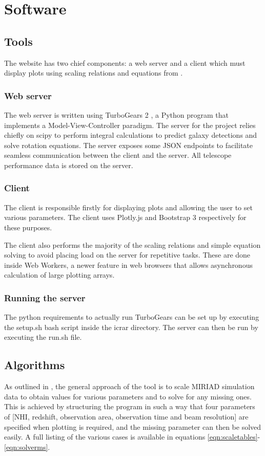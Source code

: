 \documentclass[11pt]{article}
\begin{document}
\section{Software}

\subsection{Tools}

The website has two chief components: a web server and a client which must display plots using scaling relations and equations from \parencite{duffy}.

\subsubsection{Web server}
The web server is written using TurboGears 2 \parencite{turbogears}, a Python program that implements a Model-View-Controller paradigm. The server for the project relies chiefly on scipy \parencite{scipy} to perform integral calculations to predict galaxy detections and solve rotation equations. The server exposes some JSON endpoints to facilitate seamless communication between the client and the server. All telescope performance data is stored on the server.

\subsubsection{Client}
The client is responsible firstly for displaying plots and allowing the user to set various parameters. The client uses Plotly.js \parencite{plotly} and Bootstrap 3 \parencite{bootstrap} respectively for these purposes.

The client also performs the majority of the scaling relations and simple equation solving to avoid placing load on the server for repetitive tasks. These are done inside Web Workers, a newer feature in web browsers that allows asynchronous calculation of large plotting arrays.

\subsubsection{Running the server}
The python requirements to actually run TurboGears can be set up by executing the setup.sh bash script inside the icrar directory. The server can then be run by executing the run.sh file.

\subsection{Algorithms}
As outlined in \parencite{popping2014}, the general approach of the tool is to scale MIRIAD simulation data to obtain values for various parameters and to solve for any missing ones. This is achieved by structuring the program in such a way that four parameters of [NHI, redshift, observation area, observation time and beam resolution] are specified when plotting is required, and the missing parameter can then be solved easily. A full listing of the various cases is available in equations \ref{eqn:scaletables}-\ref{eqn:solverms}.
\end{document}
